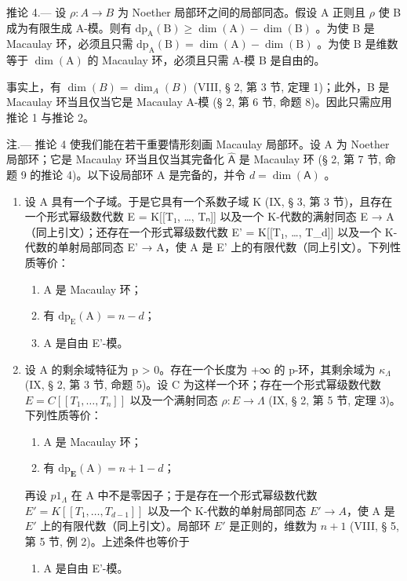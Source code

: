 推论 4.--- 设 \(\rho: A \to B\) 为 Noether 局部环之间的局部同态。假设 A 正则且 \(\rho\) 使 B 成为有限生成 A-模。则有 \(\mathrm{dp}_{\mathrm{A}}(\mathrm{B}) \geqslant \dim(\mathrm{A}) - \dim(\mathrm{B})\) 。为使 B 是 Macaulay 环，必须且只需 \(\mathrm{dp}_{\mathrm{A}}(\mathrm{B}) = \dim(\mathrm{A}) - \dim(\mathrm{B})\) 。为使 B 是维数等于 \(\dim(\mathrm{A})\) 的 Macaulay 环，必须且只需 A-模 B 是自由的。

事实上，有 \(\dim(B) = \dim_A(B)\) (VIII, § 2, 第 3 节, 定理 1)；此外，B 是 Macaulay 环当且仅当它是 Macaulay A-模 (§ 2, 第 6 节, 命题 8)。因此只需应用推论 1 与推论 2。

注.--- 推论 4 使我们能在若干重要情形刻画 Macaulay 局部环。设 A 为 Noether 局部环；它是 Macaulay 环当且仅当其完备化 \(\widehat{\mathsf{A}}\) 是 Macaulay 环 (§ 2, 第 7 节, 命题 9 的推论 4)。以下设局部环 A 是完备的，并令 \(d = \dim(\mathsf{A})\) 。

\begin{enumerate}
\def\labelenumi{\alph{enumi})}
\tightlist
\item
  设 A 具有一个子域。于是它具有一个系数子域 K (IX, § 3, 第 3 节)，且存在一个形式幂级数代数 E = K{[}{[}T₁, \ldots, Tₙ{]}{]} 以及一个 K-代数的满射同态 E → A（同上引文）；还存在一个形式幂级数代数 E' = K{[}{[}T₁, \ldots, T\_d{]}{]} 以及一个 K-代数的单射局部同态 E' → A，使 A 是 E' 上的有限代数（同上引文）。下列性质等价：
  \begin{enumerate}
  \def\labelenumii{(\roman{enumii})}
  \item
    A 是 Macaulay 环；
  \item
    有 \(\mathrm{dp}_{\mathrm{E}}(\mathrm{A}) = n - d\)；
  \item
    A 是自由 E'-模。
  \end{enumerate}

\item
  设 A 的剩余域特征为 p \textgreater{} 0。存在一个长度为 +∞ 的 p-环，其剩余域为 \(\kappa_{\Lambda}\) (IX, § 2, 第 3 节, 命题 5)。设 C 为这样一个环；存在一个形式幂级数代数 \(E = C[[T_{1}, \ldots, T_{n}]]\) 以及一个满射同态 \(\rho : E \to \Lambda\) (IX, § 2, 第 5 节, 定理 3)。下列性质等价：
  \begin{enumerate}
  \def\labelenumii{(\roman{enumii})}
  \item
    A 是 Macaulay 环；
  \item
    有 \(\mathrm{dp}_{\mathbf{E}}(\mathrm{A}) = n + 1 - d\)；
  \end{enumerate}

再设 \(p1_{\Lambda}\) 在 A 中不是零因子；于是存在一个形式幂级数代数 \(E' = K[[T_1, \ldots, T_{d-1}]]\) 以及一个 K-代数的单射局部同态 \(E' \to A\)，使 A 是 \(E'\) 上的有限代数（同上引文）。局部环 \(E'\) 是正则的，维数为 \(n+1\) (VIII, § 5, 第 5 节, 例 2)。上述条件也等价于

  \begin{enumerate}
  \def\labelenumii{(\roman{enumii})}
  \setcounter{enumii}{2}
  \tightlist
  \item
    A 是自由 E'-模。
  \end{enumerate}
\end{enumerate}

